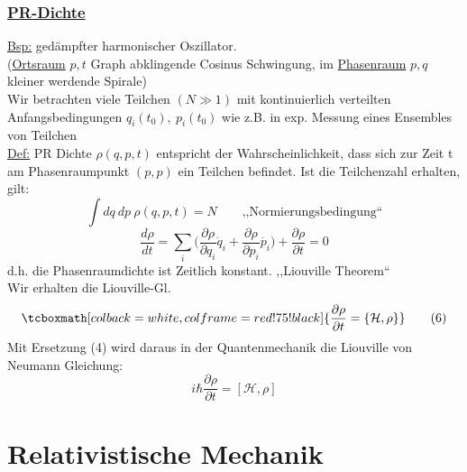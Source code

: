 \documentclass[titlepage,12pt,a4paper,ngerman]{report}
\newcommand{\tx}[1]{\textrm{#1}}
\newcommand{\ham}{\mathcal{H}}
\newcommand{\rmbox}[1]{\tcboxmath[colback=white,colframe=red!75!black]{#1}} %
\begin{document}
{\subsection{\underline{PR-Dichte}}
\underline{Bsp:} gedämpfter harmonischer Oszillator.\\[5pt]
(\underline{Ortsraum} $ p,t $ Graph abklingende Cosinus Schwingung, im \underline{Phasenraum} $ p,q $ kleiner werdende Spirale)\\[5pt]
Wir betrachten viele Teilchen $ (N \gg 1) $ mit kontinuierlich verteilten Anfangsbedingungen $ q_i(t_0) ,\  p_i(t_0) $ wie z.B. in exp. Messung eines Ensembles von Teilchen\\[10pt]
\underline{Def:} PR Dichte $ \rho(q,p,t) $ entspricht der Wahrscheinlichkeit, dass sich zur Zeit t am Phasenraumpunkt $ (p,p) $ ein Teilchen befindet. Ist die Teilchenzahl erhalten, gilt:
\begin{equation*}
\int dq \ dp \ \rho(q,p,t) = N \qquad \tx{,,Normierungsbedingung``}
\end{equation*}
\begin{equation*}
\frac{d \rho}{d t} = \sum_i \bigg( \frac{\partial \rho}{\partial q_i} \dot{q}_i + \frac{\partial \rho}{\partial p_i} \dot{p_i} \bigg) + \frac{\partial \rho}{\partial t} = 0
\end{equation*}
d.h. die Phasenraumdichte ist Zeitlich konstant. ,,Liouville Theorem``\\[5pt]
Wir erhalten die Liouville-Gl.
\begin{equation*}
\rmbox{\frac{\partial \rho}{\partial t} = \{\ham , \rho\}} \tag{6}
\end{equation*}
Mit Ersetzung (4) wird daraus in der Quantenmechanik die Liouville von Neumann Gleichung:
\begin{equation*}
i \hbar \frac{\partial \rho}{\partial t} = [\ham, \rho] \tag{7}
\end{equation*}

\chapter{Relativistische Mechanik}
%
}
\end{document}
